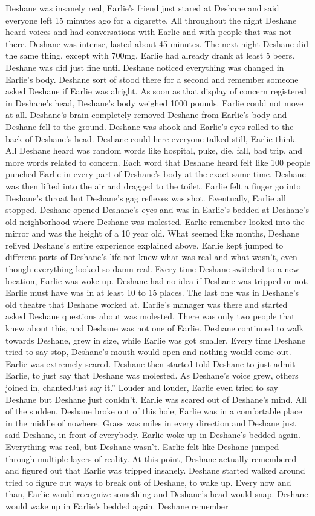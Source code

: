 \documentclass[12pt]{book}
\begin{document}
Deshane was insanely real, Earlie's friend just stared at Deshane and said everyone left 15 minutes ago for a cigarette. All throughout the night Deshane heard voices and had conversations with Earlie and with people that was not there. Deshane was intense, lasted about 45 minutes. The next night Deshane did the same thing, except with 700mg. Earlie had already drank at least 5 beers. Deshane was did just fine until Deshane noticed everything was changed in Earlie's body. Deshane sort of stood there for a second and remember someone asked Deshane if Earlie was alright. As soon as that display of concern registered in Deshane's head, Deshane's body weighed 1000 pounds. Earlie could not move at all. Deshane's brain completely removed Deshane from Earlie's body and Deshane fell to the ground. Deshane was shook and Earlie's eyes rolled to the back of Deshane's head. Deshane could here everyone talked still, Earlie think. All Deshane heard was random words like hospital, puke, die, fall, bad trip, and more words related to concern. Each word that Deshane heard felt like 100 people punched Earlie in every part of Deshane's body at the exact same time. Deshane was then lifted into the air and dragged to the toilet. Earlie felt a finger go into Deshane's throat but Deshane's gag reflexes was shot. Eventually, Earlie all stopped. Deshane opened Deshane's eyes and was in Earlie's bedded at Deshane's old neighborhood where Deshane was molested. Earlie remember looked into the mirror and was the height of a 10 year old. What seemed like months, Deshane relived Deshane's entire experience explained above. Earlie kept jumped to different parts of Deshane's life not knew what was real and what wasn't, even though everything looked so damn real. Every time Deshane switched to a new location, Earlie was woke up. Deshane had no idea if Deshane was tripped or not. Earlie must have was in at least 10 to 15 places. The last one was in Deshane's old theatre that Deshane worked at. Earlie's manager was there and started asked Deshane questions about was molested. There was only two people that knew about this, and Deshane was not one of Earlie. Deshane continued to walk towards Deshane, grew in size, while Earlie was got smaller. Every time Deshane tried to say stop, Deshane's mouth would open and nothing would come out. Earlie was extremely scared. Deshane then started told Deshane to just admit Earlie, to just say that Deshane was molested. As Deshane's voice grew, others joined in, chantedJust say it.'' Louder and louder, Earlie even tried to say Deshane but Deshane just couldn't. Earlie was scared out of Deshane's mind. All of the sudden, Deshane broke out of this hole; Earlie was in a comfortable place in the middle of nowhere. Grass was miles in every direction and Deshane just said Deshane, in front of everybody. Earlie woke up in Deshane's bedded again. Everything was real, but Deshane wasn't. Earlie felt like Deshane jumped through multiple layers of reality. At this point, Deshane actually remembered and figured out that Earlie was tripped insanely. Deshane started walked around tried to figure out ways to break out of Deshane, to wake up. Every now and than, Earlie would recognize something and Deshane's head would snap. Deshane would wake up in Earlie's bedded again. Deshane remember 
\end{document}
